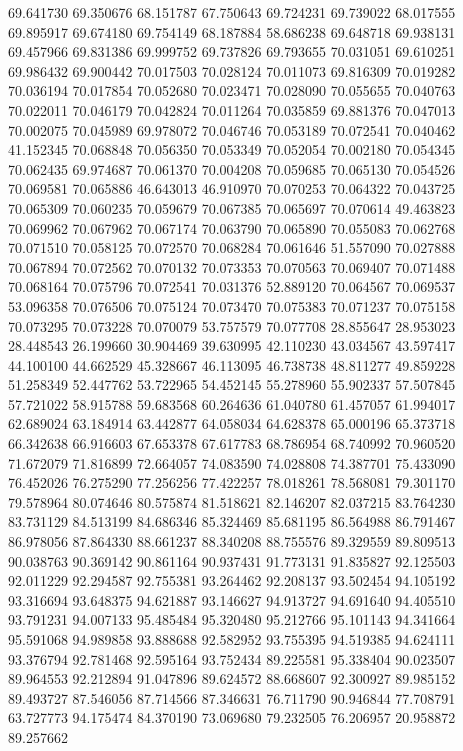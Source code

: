 69.641730
69.350676
68.151787
67.750643
69.724231
69.739022
68.017555
69.895917
69.674180
69.754149
68.187884
58.686238
69.648718
69.938131
69.457966
69.831386
69.999752
69.737826
69.793655
70.031051
69.610251
69.986432
69.900442
70.017503
70.028124
70.011073
69.816309
70.019282
70.036194
70.017854
70.052680
70.023471
70.028090
70.055655
70.040763
70.022011
70.046179
70.042824
70.011264
70.035859
69.881376
70.047013
70.002075
70.045989
69.978072
70.046746
70.053189
70.072541
70.040462
41.152345
70.068848
70.056350
70.053349
70.052054
70.002180
70.054345
70.062435
69.974687
70.061370
70.004208
70.059685
70.065130
70.054526
70.069581
70.065886
46.643013
46.910970
70.070253
70.064322
70.043725
70.065309
70.060235
70.059679
70.067385
70.065697
70.070614
49.463823
70.069962
70.067962
70.067174
70.063790
70.065890
70.055083
70.062768
70.071510
70.058125
70.072570
70.068284
70.061646
51.557090
70.027888
70.067894
70.072562
70.070132
70.073353
70.070563
70.069407
70.071488
70.068164
70.075796
70.072541
70.031376
52.889120
70.064567
70.069537
53.096358
70.076506
70.075124
70.073470
70.075383
70.071237
70.075158
70.073295
70.073228
70.070079
53.757579
70.077708
28.855647
28.953023
28.448543
26.199660
30.904469
39.630995
42.110230
43.034567
43.597417
44.100100
44.662529
45.328667
46.113095
46.738738
48.811277
49.859228
51.258349
52.447762
53.722965
54.452145
55.278960
55.902337
57.507845
57.721022
58.915788
59.683568
60.264636
61.040780
61.457057
61.994017
62.689024
63.184914
63.442877
64.058034
64.628378
65.000196
65.373718
66.342638
66.916603
67.653378
67.617783
68.786954
68.740992
70.960520
71.672079
71.816899
72.664057
74.083590
74.028808
74.387701
75.433090
76.452026
76.275290
77.256256
77.422257
78.018261
78.568081
79.301170
79.578964
80.074646
80.575874
81.518621
82.146207
82.037215
83.764230
83.731129
84.513199
84.686346
85.324469
85.681195
86.564988
86.791467
86.978056
87.864330
88.661237
88.340208
88.755576
89.329559
89.809513
90.038763
90.369142
90.861164
90.937431
91.773131
91.835827
92.125503
92.011229
92.294587
92.755381
93.264462
92.208137
93.502454
94.105192
93.316694
93.648375
94.621887
93.146627
94.913727
94.691640
94.405510
93.791231
94.007133
95.485484
95.320480
95.212766
95.101143
94.341664
95.591068
94.989858
93.888688
92.582952
93.755395
94.519385
94.624111
93.376794
92.781468
92.595164
93.752434
89.225581
95.338404
90.023507
89.964553
92.212894
91.047896
89.624572
88.668607
92.300927
89.985152
89.493727
87.546056
87.714566
87.346631
76.711790
90.946844
77.708791
63.727773
94.175474
84.370190
73.069680
79.232505
76.206957
20.958872
89.257662
